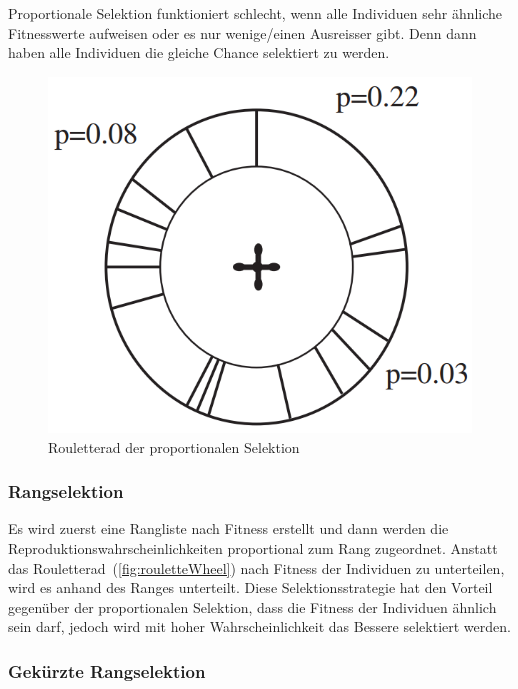         \medskip

        Proportionale Selektion funktioniert schlecht,
        wenn alle Individuen sehr ähnliche Fitnesswerte aufweisen oder es nur wenige/einen Ausreisser gibt.
        Denn dann haben alle Individuen die gleiche Chance selektiert zu werden.

        \begin{figure}[H]
          \includegraphics[scale=0.4,center]{graphics/roulettewheel}
          \caption[\protect{}, S.24]{Rouletterad der proportionalen Selektion\label{fig:rouletteWheel}}
        \end{figure}

      \subsubsection{Rangselektion}

        Es wird zuerst eine Rangliste nach Fitness erstellt und dann werden die Reproduktionswahrscheinlichkeiten proportional zum Rang zugeordnet.
        Anstatt das Rouletterad~(\vref{fig:rouletteWheel}) nach Fitness der Individuen zu unterteilen,
        wird es anhand des Ranges unterteilt.
        Diese Selektionsstrategie hat den Vorteil gegenüber der proportionalen Selektion,
        dass die Fitness der Individuen ähnlich sein darf,
        jedoch wird mit hoher Wahrscheinlichkeit das Bessere selektiert werden.

      \subsubsection{Gekürzte Rangselektion}

